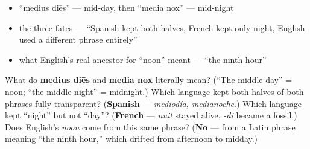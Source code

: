 \begin{itemize}
\raggedright
  \item \textquotedblleft{}medius diēs\textquotedblright{} — mid-day, then \textquotedblleft{}media nox\textquotedblright{} — mid-night
  \item the three fates — \textquotedblleft{}Spanish kept both halves, French kept only night, English used a different phrase entirely\textquotedblright{}
  \item what English's real ancestor for \textquotedblleft{}noon\textquotedblright{} meant — \textquotedblleft{}the ninth hour\textquotedblright{}
\end{itemize}

\begin{tcolorbox}[breakable,colback=teal!4,colframe=teal!35!black,title={Before you move on}]
What do \textbf{medius diēs} and \textbf{media nox} literally mean? (\textquotedblleft{}The middle day\textquotedblright{} = noon; \textquotedblleft{}the middle night\textquotedblright{} = midnight.) Which language kept both halves of both phrases fully transparent? (\textbf{Spanish} — \emph{mediodía, medianoche}.) Which language kept \textquotedblleft{}night\textquotedblright{} but not \textquotedblleft{}day\textquotedblright{}? (\textbf{French} — \emph{nuit} stayed alive, \emph{-di} became a fossil.) Does English's \emph{noon} come from this same phrase? (\textbf{No} — from a Latin phrase meaning \textquotedblleft{}the ninth hour,\textquotedblright{} which drifted from afternoon to midday.)
\end{tcolorbox}

